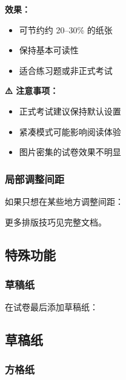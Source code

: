 \textbf{效果：}
\begin{itemize}
  \item 可节约约 20--30\% 的纸张
  \item 保持基本可读性
  \item 适合练习题或非正式考试
\end{itemize}

\textbf{⚠️ 注意事项：}
\begin{itemize}
  \item 正式考试建议保持默认设置
  \item 紧凑模式可能影响阅读体验
  \item 图片密集的试卷效果不明显
\end{itemize}

\subsubsection{局部调整间距}

如果只想在某些地方调整间距：

\begin{latexcode}
  \vspace{1em}

  \vspace{-0.5em}

  \vfill
\end{latexcode}

更多排版技巧见完整文档。


\subsection{特殊功能}

\subsubsection{草稿纸}

在试卷最后添加草稿纸：

\begin{latexcode}
  \newpage
  \section*{草稿纸}
  \draftpaper
\end{latexcode}

\subsubsection{方格纸}

